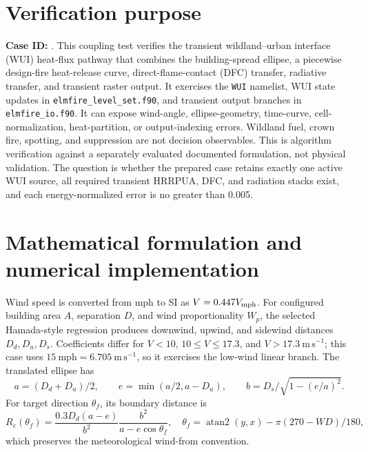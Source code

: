 \section{Verification purpose}

\textbf{Case ID:} \texttt{\CaseID}. This coupling test verifies the transient wildland--urban interface (WUI) heat-flux pathway that combines the building-spread ellipse, a piecewise design-fire heat-release curve, direct-flame-contact (DFC) transfer, radiative transfer, and transient raster output. It exercises the \texttt{WUI} namelist, WUI state updates in \texttt{elmfire\_level\_set.f90}, and transient output branches in \texttt{elmfire\_io.f90}. It can expose wind-angle, ellipse-geometry, time-curve, cell-normalization, heat-partition, or output-indexing errors. Wildland fuel, crown fire, spotting, and suppression are not decision observables. This is algorithm verification against a separately evaluated documented formulation, not physical validation. The question is whether the prepared case retains exactly one active WUI source, all required transient HRRPUA, DFC, and radiation stacks exist, and each energy-normalized error is no greater than 0.005.

\section{Mathematical formulation and numerical implementation}

Wind speed is converted from mph to SI as \(V=0.447V_{\rm mph}\). For configured building area \(A\), separation \(D\), and wind proportionality \(W_p\), the selected Hamada-style regression produces downwind, upwind, and sidewind distances \(D_d,D_u,D_s\). Coefficients differ for \(V<10\), \(10\le V\le17.3\), and \(V>17.3~\mathrm{m\,s^{-1}}\); this case uses \(15~\mathrm{mph}=6.705~\mathrm{m\,s^{-1}}\), so it exercises the low-wind linear branch. The translated ellipse has
\[
 a=(D_d+D_u)/2,\qquad e=\min(a/2,a-D_u),\qquad
 b=D_s/\sqrt{1-(e/a)^2}.
\]
For target direction \(\theta_f\), its boundary distance is
\[
 R_e(\theta_f)=
 \frac{0.3D_d(a-e)}{b^2}\frac{b^2}{a-e\cos\theta_f},
 \quad
 \theta_f=\operatorname{atan2}(y,x)-\pi(270-WD)/180,
\]
which preserves the meteorological wind-from convention.


